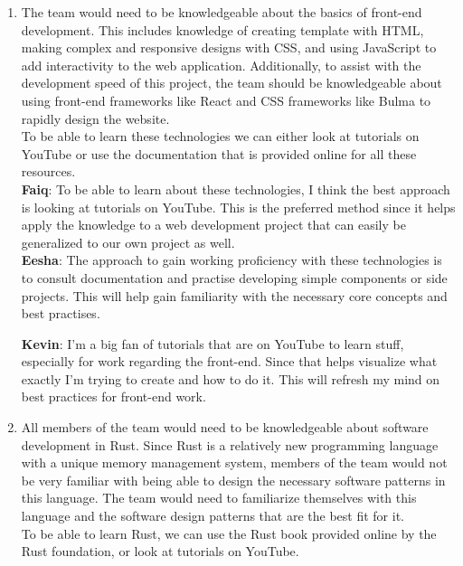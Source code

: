\documentclass[12pt, titlepage]{article}
\begin{document}
	\begin{enumerate}
		\item The team would need to be knowledgeable about the basics of front-end development. This includes knowledge of creating template with HTML, making complex and responsive designs with CSS, and using JavaScript to add interactivity to the web application. Additionally, to assist with the development speed of this project, the team should be knowledgeable about using front-end frameworks like React and CSS frameworks like Bulma to rapidly design the website.\\
		
		To be able to learn these technologies we can either look at tutorials on YouTube or use the documentation that is provided online for all these resources.\\
		
		\textbf{Faiq}: To be able to learn about these technologies, I think the best approach is looking at tutorials on YouTube. This is the preferred method since it helps apply the knowledge to a web development project that can easily be generalized to our own project as well.\\
		
		\textbf{Eesha}: The approach to gain working proficiency with these technologies is to consult documentation and practise developing simple components or side projects. This will help gain familiarity with the necessary core concepts and best practises.
		
		\textbf{Kevin}: I'm a big fan of tutorials that are on YouTube to learn stuff, especially for work regarding the front-end. Since that helps visualize what exactly I'm trying to create and how to do it. This will refresh my mind on best practices for front-end work.  
		
		\item All members of the team would need to be knowledgeable about software development in Rust. Since Rust is a relatively new programming language with a unique memory management system, members of the team would not be very familiar with being able to design the necessary software patterns in this language. The team would need to familiarize themselves with this language and the software design patterns that are the best fit for it.\\
		
		To be able to learn Rust, we can use the Rust book provided online by the Rust foundation, or look at tutorials on YouTube.\\
		

\end{enumerate}
\end{document}
